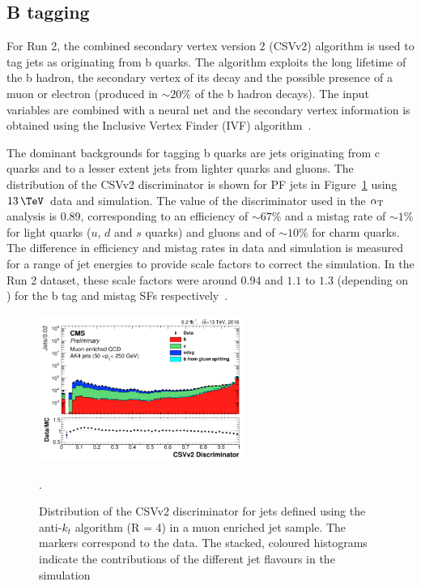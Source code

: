 \subsection{B tagging}
\label{sec:btag}
For Run 2, the combined secondary vertex version 2 (CSVv2) algorithm is used to tag jets as originating
from b quarks. The algorithm exploits the long lifetime of the b hadron, the secondary vertex of its decay
and the possible presence of a muon or electron (produced in $\sim 20\%$ of the b hadron decays). The 
input variables are combined with a neural net and the secondary vertex
information is obtained using the Inclusive Vertex Finder (IVF) algorithm~\cite{csv_pas}.

The dominant backgrounds for tagging b quarks are jets originating from c quarks and to a lesser extent
jets from lighter quarks and gluons. The distribution of the CSVv2 discriminator is shown for PF jets
in Figure~\ref{fig:csv_fig} using $13\,\TeV$~data and simulation. The value of the discriminator
used in the $\alpha_{\text{T}}$ analysis is 0.89, corresponding to an efficiency of $\sim67\%$ and 
a mistag rate of $\sim 1\%$ for light quarks ($u$, $d$ and $s$ quarks) and gluons and of $\sim 10\%$ for
charm quarks. The difference in efficiency and mistag rates in data and simulation is measured 
for a range of jet energies to provide scale factors to correct the simulation. In the
Run 2 dataset, these scale factors were around $0.94$ and $1.1$ to $1.3$ (depending on \pt) for the b tag and mistag SFs 
respectively~\cite{csv_fig}.

\begin{figure}
\centering
    \includegraphics[width=0.6\textwidth]{./Figures/reconstruction/csv_fig.png}
  \caption{\label{fig:csv_fig} Distribution of the CSVv2 discriminator for jets 
  defined using the anti-$k_t$ algorithm (R = 4) in a muon enriched jet sample. The markers correspond to the data. 
The stacked, coloured histograms indicate the contributions of the different 
jet flavours in the simulation~\cite{csv_fig}}.
\end{figure}
%
%
%
